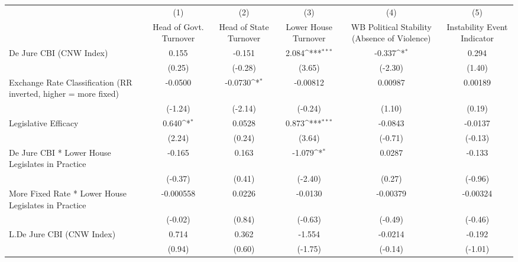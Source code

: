 {
\def\sym#1{\ifmmode^{#1}\else\(^{#1}\)\fi}
\begin{longtable}{l*{5}{c}}
\toprule\endfirsthead\midrule\endhead\midrule\endfoot\endlastfoot
                &\multicolumn{1}{c}{(1)}&\multicolumn{1}{c}{(2)}&\multicolumn{1}{c}{(3)}&\multicolumn{1}{c}{(4)}&\multicolumn{1}{c}{(5)}\\
                &\multicolumn{1}{c}{Head of Govt. Turnover}&\multicolumn{1}{c}{Head of State Turnover}&\multicolumn{1}{c}{Lower House Turnover}&\multicolumn{1}{c}{WB Political Stability (Absence of Violence)}&\multicolumn{1}{c}{Instability Event Indicator}\\
\midrule
De Jure CBI (CNW Index)&    0.155         &   -0.151         &    2.084\sym{***}&   -0.337\sym{*}  &    0.294         \\
                &   (0.25)         &  (-0.28)         &   (3.65)         &  (-2.30)         &   (1.40)         \\
\addlinespace
Exchange Rate Classification (RR inverted, higher = more fixed)&  -0.0500         &  -0.0730\sym{*}  & -0.00812         &  0.00987         &  0.00189         \\
                &  (-1.24)         &  (-2.14)         &  (-0.24)         &   (1.10)         &   (0.19)         \\
\addlinespace
Legislative Efficacy&    0.640\sym{*}  &   0.0528         &    0.873\sym{***}&  -0.0843         &  -0.0137         \\
                &   (2.24)         &   (0.24)         &   (3.64)         &  (-0.71)         &  (-0.13)         \\
\addlinespace
De Jure CBI * Lower House Legislates in Practice&   -0.165         &    0.163         &   -1.079\sym{*}  &   0.0287         &   -0.133         \\
                &  (-0.37)         &   (0.41)         &  (-2.40)         &   (0.27)         &  (-0.96)         \\
\addlinespace
More Fixed Rate * Lower House Legislates in Practice&-0.000558         &   0.0226         &  -0.0130         & -0.00379         & -0.00324         \\
                &  (-0.02)         &   (0.84)         &  (-0.63)         &  (-0.49)         &  (-0.46)         \\
\addlinespace
L.De Jure CBI (CNW Index)&    0.714         &    0.362         &   -1.554         &  -0.0214         &   -0.192         \\
                &   (0.94)         &   (0.60)         &  (-1.75)         &  (-0.14)         &  (-1.01)         \\

\end{longtable}}
